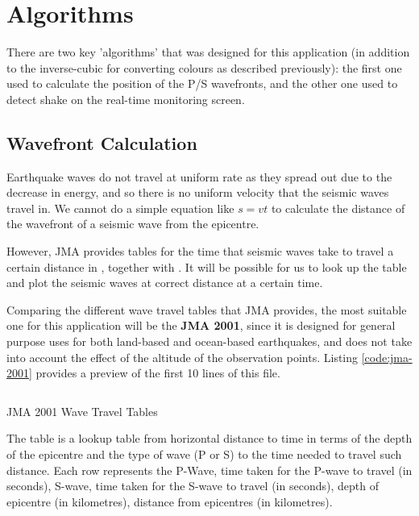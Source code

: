 \section{Algorithms}

There are two key 'algorithms' that was designed for this application (in addition to the inverse-cubic for converting colours as described previously): the first one used to calculate the position of the P/S wavefronts, and the other one used to detect shake on the real-time monitoring screen.

\subsection{Wavefront Calculation}

Earthquake waves do not travel at uniform rate as they spread out due to the decrease in energy, and so there is no uniform velocity that the seismic waves travel in. We cannot do a simple equation like \(s = vt\) to calculate the distance of the wavefront of a seismic wave from the epicentre.

However, JMA provides tables for the time that seismic waves take to travel a certain distance in \autocite{jma-timetable-2001}, together with \autocite{jma-timetable-format}. It will be possible for us to look up the table and plot the seismic waves at correct distance at a certain time.

Comparing the different wave travel tables that JMA provides, the most suitable one for this application will be the \textbf{JMA 2001}, since it is designed for general purpose uses for both land-based and ocean-based earthquakes, and does not take into account the effect of the altitude of the observation points. Listing \ref{code:jma-2001} provides a preview of the first 10 lines of this file.

\begin{listing}[htp]
    \inputminted[lastline=10,showspaces]{text}{code/tjma2001.txt}
    \caption{JMA 2001 Wave Travel Tables}
    \label{code:jma-2001}
\end{listing}

The table is a lookup table from horizontal distance to time in terms of the depth of the epicentre and the type of wave (P or S) to the time needed to travel such distance. Each row represents the P-Wave, time taken for the P-wave to travel (in seconds), S-wave, time taken for the S-wave to travel (in seconds), depth of epicentre (in kilometres), distance from epicentres (in kilometres).

